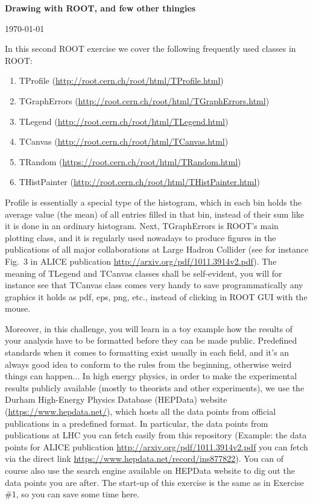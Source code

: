 \documentclass[11pt]{article}
\begin{document}
\begin{center}
\Large{\bf{Drawing with ROOT, and few other thingies}}\\
\end{center}
\begin{center}
{\small\today}
\end{center}

\bigskip

\noindent In this second ROOT exercise we cover the following frequently used classes in ROOT:
%
\begin{enumerate}
\item TProfile (\url{http://root.cern.ch/root/html/TProfile.html})
\item TGraphErrors (\url{http://root.cern.ch/root/html/TGraphErrors.html})
\item TLegend (\url{http://root.cern.ch/root/html/TLegend.html}) 
\item TCanvas (\url{http://root.cern.ch/root/html/TCanvas.html})
\item TRandom (\url{https://root.cern.ch/root/html/TRandom.html})
\item THistPainter (\url{http://root.cern.ch/root/html/THistPainter.html})
\end{enumerate} 
%

Profile is essentially a special type of the histogram, which in each bin holds the average value (the mean) of all entries filled in that bin, instead of their sum like it is done in an ordinary histogram. Next, TGraphErrors is ROOT's main plotting class, and it is regularly used nowadays to produce figures in the publications of all major collaborations at Large Hadron Collider (see for instance Fig.~3 in ALICE publication \url{http://arxiv.org/pdf/1011.3914v2.pdf}). The meaning of TLegend and TCanvas classes shall be self-evident, you will for instance see that TCanvas class comes very handy to save programmatically any graphics it holds as pdf, eps, png, etc., instead of clicking in ROOT  GUI with the mouse.

Moreover, in this challenge, you will learn in a toy example how the results of your analysis have to be formatted before they can be made public. Predefined standards when it comes to formatting exist usually in each field, and it's an always good idea to conform to the rules from the beginning, otherwise weird things can happen... In high energy physics, in order to make the experimental results publicly available (mostly to theorists and other experiments), we use the Durham High-Energy Physics Database (HEPData) website (\url{https://www.hepdata.net/}), which hosts all the data points from official publications in a predefined format. In particular, the data points from publications at LHC you can fetch easily from this repository (Example: the data points for ALICE publication \url{http://arxiv.org/pdf/1011.3914v2.pdf} you can fetch via the direct link \url{https://www.hepdata.net/record/ins877822}). You can of course also use the search engine available on HEPData website to dig out the data points you are after. The start-up of this exercise is the same as in Exercise \#1, so you can save some time here. 
\end{document}
